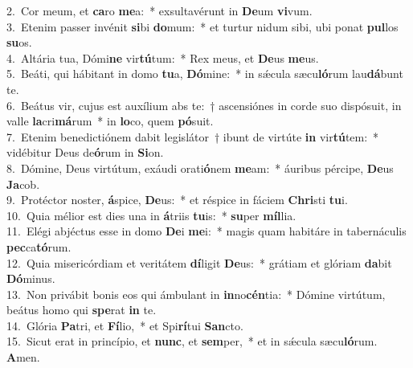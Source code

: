 {2.~}Cor meum, et \textbf{ca}ro \textbf{me}a:~* exsultavérunt in \textbf{De}um \textbf{vi}vum.\\
{3.~}Etenim passer invénit \textbf{si}bi \textbf{do}mum:~* et turtur nidum sibi, ubi ponat \textbf{pul}los \textbf{su}os.\\
{4.~}Altária tua, Dómi\textbf{ne} vir\textbf{tú}tum:~* Rex meus, et \textbf{De}us \textbf{me}us.\\
{5.~}Beáti, qui hábitant in domo \textbf{tu}a, \textbf{Dó}mine:~* in sǽcula sæcu\textbf{ló}rum lau\textbf{dá}bunt te.\\
{6.~}Beátus vir, cujus est auxílium abs te:~† ascensiónes in corde suo dispósuit, in valle \textbf{la}cri\textbf{má}rum~* in \textbf{lo}co, quem \textbf{pó}suit.\\
{7.~}Etenim benedictiónem dabit legislátor~† ibunt de virtúte \textbf{in} vir\textbf{tú}tem:~* vidébitur Deus de\textbf{ó}rum in \textbf{Si}on.\\
{8.~}Dómine, Deus virtútum, exáudi orati\textbf{ó}nem \textbf{me}am:~* áuribus pércipe, \textbf{De}us \textbf{Ja}cob.\\
{9.~}Protéctor noster, \textbf{á}spice, \textbf{De}us:~* et réspice in fáciem \textbf{Chri}sti \textbf{tu}i.\\
{10.~}Quia mélior est dies una in \textbf{á}triis \textbf{tu}is:~* \textbf{su}per \textbf{míl}lia.\\
{11.~}Elégi abjéctus esse in domo \textbf{De}i \textbf{me}i:~* magis quam habitáre in tabernáculis \textbf{pec}ca\textbf{tó}rum.\\
{12.~}Quia misericórdiam et veritátem \textbf{dí}ligit \textbf{De}us:~* grátiam et glóriam \textbf{da}bit \textbf{Dó}minus.\\
{13.~}Non privábit bonis eos qui ámbulant in \textbf{in}no\textbf{cén}tia:~* Dómine virtútum, beátus homo qui \textbf{spe}rat \textbf{in} te.\\
{14.~}Glória \textbf{Pa}tri, et \textbf{Fí}lio,~* et Spi\textbf{rí}tui \textbf{San}cto.\\
{15.~}Sicut erat in princípio, et \textbf{nunc}, et \textbf{sem}per,~* et in sǽcula sæcu\textbf{ló}rum. \textbf{A}men.\\
